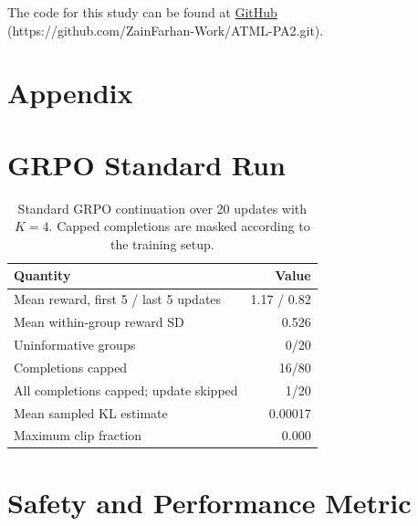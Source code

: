 \documentclass{article}
\begin{document}
The code for this study can be found at \href{https://github.com/ZainFarhan-Work/ATML-PA2.git}{GitHub} (https://github.com/ZainFarhan-Work/ATML-PA2.git).

\small
\nocite{*}


\normalsize

\clearpage

\appendix
\section*{Appendix}

\section{GRPO Standard Run}

\begin{table}[H]
\centering
\small
\setlength{\tabcolsep}{4pt}
\begin{tabular}{lr}
\toprule
Quantity & Value \\
\midrule
Mean reward, first 5 / last 5 updates & 1.17 / 0.82 \\
Mean within-group reward SD & 0.526 \\
Uninformative groups & 0/20 \\
Completions capped & 16/80 \\
All completions capped; update skipped & 1/20 \\
Mean sampled KL estimate & 0.00017 \\
Maximum clip fraction & 0.000 \\
\bottomrule
\end{tabular}
\caption{Standard GRPO continuation over 20 updates with $K=4$.
Capped completions are masked according to the training setup.}
\label{tab:grpo_standard}
\end{table}

\section{Safety and Performance Metric}
\end{document}
